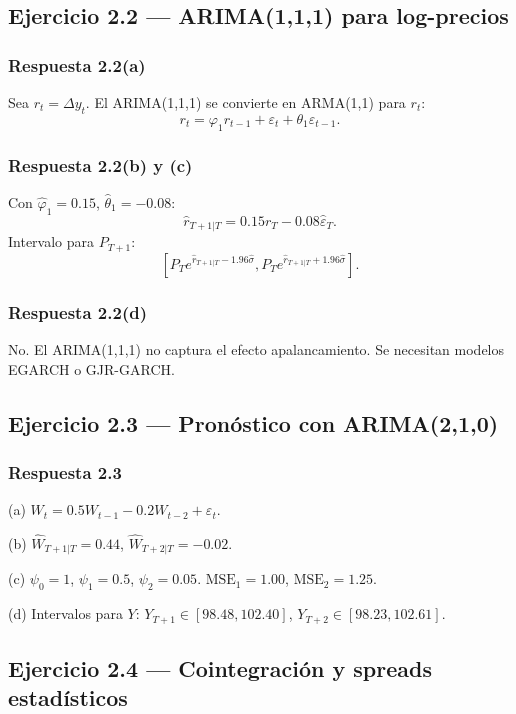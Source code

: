 \documentclass[12pt, letterpaper]{article}
\begin{document}
\subsection{Ejercicio 2.2 — ARIMA(1,1,1) para log-precios}

\subsubsection*{Respuesta 2.2(a)}

Sea $r_t = \Delta y_t$. El ARIMA(1,1,1) se convierte en ARMA(1,1) para $r_t$:
\[
r_t = \varphi_1 r_{t-1} + \varepsilon_t + \theta_1 \varepsilon_{t-1}.
\]

\subsubsection*{Respuesta 2.2(b) y (c)}

Con $\hat{\varphi}_1=0.15$, $\hat{\theta}_1=-0.08$:
\[
\hat{r}_{T+1|T} = 0.15 r_T - 0.08 \hat{\varepsilon}_T.
\]
Intervalo para $P_{T+1}$:
\[
\left[ P_T e^{\hat{r}_{T+1|T}-1.96\hat{\sigma}}, P_T e^{\hat{r}_{T+1|T}+1.96\hat{\sigma}} \right].
\]

\subsubsection*{Respuesta 2.2(d)}

No. El ARIMA(1,1,1) no captura el efecto apalancamiento. Se necesitan modelos EGARCH o GJR-GARCH.

\subsection{Ejercicio 2.3 — Pronóstico con ARIMA(2,1,0)}

\subsubsection*{Respuesta 2.3}

(a) $W_t = 0.5W_{t-1} - 0.2W_{t-2} + \varepsilon_t$.

(b) $\hat{W}_{T+1|T}=0.44$, $\hat{W}_{T+2|T}=-0.02$.

(c) $\psi_0=1$, $\psi_1=0.5$, $\psi_2=0.05$. $\text{MSE}_1=1.00$, $\text{MSE}_2=1.25$.

(d) Intervalos para $Y$: $Y_{T+1}\in[98.48,102.40]$, $Y_{T+2}\in[98.23,102.61]$.

\subsection{Ejercicio 2.4 — Cointegración y spreads estadísticos}
\end{document}

